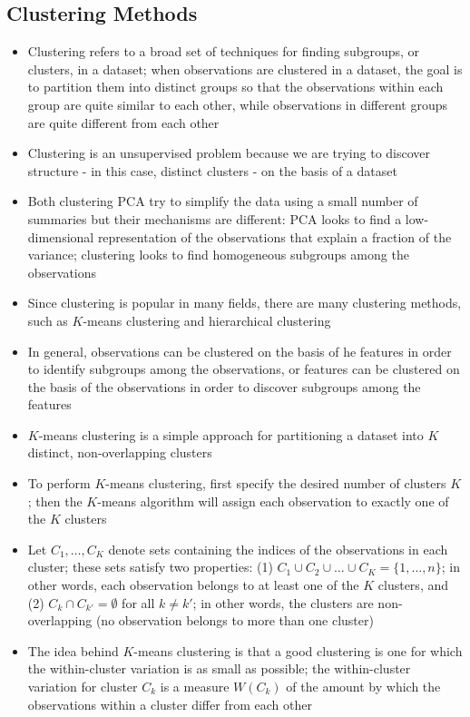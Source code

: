 \documentclass[12pt]{article}
\begin{document}
\subsection{Clustering Methods}
\begin{itemize} 
\item Clustering refers to a broad set of techniques for finding subgroups, or clusters, in a dataset; when observations are clustered in a dataset, the goal is to partition them into distinct groups so that the observations within each group are quite similar to each other, while observations in different groups are quite different from each other 
\item Clustering is an unsupervised problem because we are trying to discover structure - in this case, distinct clusters - on the basis of a dataset 
\item Both clustering PCA try to simplify the data using a small number of summaries but their mechanisms are different: PCA looks to find a low-dimensional representation of the observations that explain a fraction of the variance; clustering looks to find homogeneous subgroups among the observations 
\item Since clustering is popular in many fields, there are many clustering methods, such as $K$-means clustering and hierarchical clustering
\item In general, observations can be clustered on the basis of he features in order to identify subgroups among the observations, or features can be clustered on the basis of the observations in order to discover subgroups among the features 
\item $K$-means clustering is a simple approach for partitioning a dataset into $K$ distinct, non-overlapping clusters 
\item To perform $K$-means clustering, first specify the desired number of clusters $K$; then the $K$-means algorithm will assign each observation to exactly one of the $K$ clusters 
\item Let $C_1,\dots,C_K$ denote sets containing the indices of the observations in each cluster; these sets satisfy two properties: (1) $C_1 \cup C_2 \cup \dots \cup C_K = \{1,\dots,n\}$; in other words, each observation belongs to at least one of the $K$ clusters, and (2) $C_k \cap C_{k'} = \emptyset$ for all $k \neq k'$; in other words, the clusters are non-overlapping (no observation belongs to more than one cluster) 
\item The idea behind $K$-means clustering is that a good clustering is one for which the within-cluster variation is as small as possible; the within-cluster variation for cluster $C_k$ is a measure $W(C_k)$ of the amount by which the observations within a cluster differ from each other 

\end{itemize}
\end{document}
